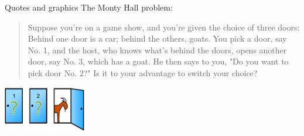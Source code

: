 \documentclass[xcolor={usenames,dvipsnames}]{beamer}
\begin{document}
\begin{frame}[noframenumbering]{Quotes and graphics}
  The Monty Hall problem:
  \begin{quote}
    Suppose you're on a game show, and you're given the choice of
    three doors: Behind one door is a car; behind the others,
    goats. You pick a door, say No. 1, and the host, who knows what's
    behind the doors, opens another door, say No. 3, which has a
    goat. He then says to you, "Do you want to pick door No. 2?" Is it
    to your advantage to switch your choice?

    \hfill{\em \cite{vosSavant1990monty}}
  \end{quote}
  \begin{center}
    \includegraphics[height=2cm]{img/monty/Monty_open_door}
  \end{center}
\end{frame}





\end{document}
